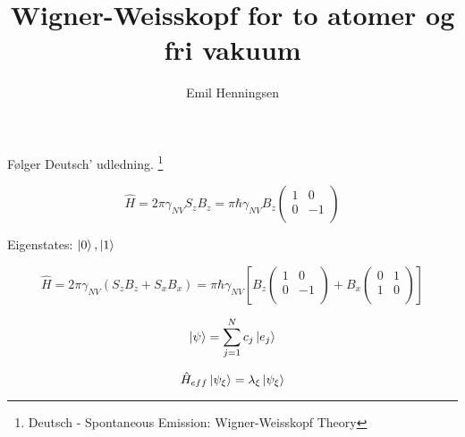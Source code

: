 \documentclass{article}
\begin{document}
\title{Wigner-Weisskopf for to atomer og fri vakuum}
\author{Emil Henningsen}
\maketitle

Følger Deutsch' udledning. \footnote[1]{Deutsch - Spontaneous Emission: Wigner-Weisskopf Theory}

\begin{equation}
    \hat{H} = 2\pi \gamma_{NV} S_z B_z = \pi \hbar \gamma_{NV} B_z \begin{pmatrix} 1 & 0 \\ 0 & -1 \\ \end{pmatrix}
\end{equation}

Eigenstates: ${\ket{0}, \ket{1}}$

\begin{equation}
    \hat{H} = 2 \pi \gamma_{NV} (S_z B_z + S_x B_x) = \pi \hbar \gamma_{NV} \left[ B_z \begin{pmatrix} 1 & 0 \\ 0 & -1 \\ \end{pmatrix} + B_x \begin{pmatrix} 0 & 1 \\ 1 & 0 \\ \end{pmatrix} \right]
\end{equation}

\begin{equation}
    \ket{\psi} = \sum_{j=1}^N c_j \ket{e_j}
\end{equation}

\begin{equation}
    \hat{H}_{eff} \ket{\psi_\xi} = \lambda_\xi \ket{\psi_\xi}
\end{equation}
\end{document}
